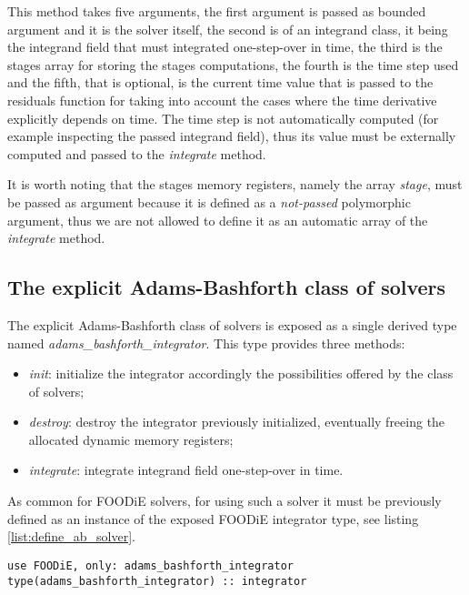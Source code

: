 \documentclass[pdftex,preprint,3p,times,numbers]{elsarticle}
\begin{document}
This method takes five arguments, the first argument is passed as bounded argument and it is the solver itself, the second is of an integrand class, it being the integrand field that must integrated one-step-over in time, the third is the stages array for storing the stages computations, the fourth is the time step used and the fifth, that is optional, is the current time value that is passed to the residuals function for taking into account the cases where the time derivative explicitly depends on time. The time step is not automatically computed (for example inspecting the passed integrand field), thus its value must be externally computed and passed to the \emph{integrate} method.

It is worth noting that the stages memory registers, namely the array \emph{stage}, must be passed as argument because it is defined as a \emph{not-passed} polymorphic argument, thus we are not allowed to define it as an automatic array of the \emph{integrate} method.

\subsection{The explicit Adams-Bashforth class of solvers}\label{subsec:solver_ab}

The explicit Adams-Bashforth class of solvers is exposed as a single derived type named \emph{adams\_bashforth\_integrator}. This type provides three methods:

\begin{itemize}
  \item \emph{init}: initialize the integrator accordingly the possibilities offered by the class of solvers;
  \item \emph{destroy}: destroy the integrator previously initialized, eventually freeing the allocated dynamic memory registers;
  \item \emph{integrate}: integrate integrand field one-step-over in time.
  \end{itemize}

As common for FOODiE solvers, for using such a solver it must be previously defined as an instance of the exposed FOODiE integrator type, see listing \ref{list:define_ab_solver}.

\begin{lstlisting}[firstnumber=1,style=code,caption={definition of an explicit Adams-Bashforth integrator},label={list:define_ab_solver}]
use FOODiE, only: adams_bashforth_integrator
type(adams_bashforth_integrator) :: integrator
\end{lstlisting}
\end{document}
